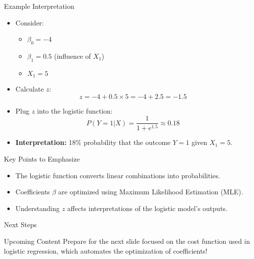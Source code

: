 \documentclass[aspectratio=169]{beamer}
\begin{document}
\begin{frame}[fragile]{Example Interpretation}
    \begin{itemize}
        \item Consider:
            \begin{itemize}
                \item \(\beta_0 = -4\)
                \item \(\beta_1 = 0.5\) (influence of \(X_1\))
                \item \(X_1 = 5\)
            \end{itemize}
        \item Calculate \(z\):
        \begin{equation}
            z = -4 + 0.5 \times 5 = -4 + 2.5 = -1.5
        \end{equation}
        
        \item Plug \(z\) into the logistic function:
        \begin{equation}
            P(Y=1|X) = \frac{1}{1 + e^{1.5}} \approx 0.18
        \end{equation}
        
        \item \textbf{Interpretation:} 18\% probability that the outcome \(Y=1\) given \(X_1 = 5\).
    \end{itemize}
\end{frame}

\begin{frame}[fragile]{Key Points to Emphasize}
    \begin{itemize}
        \item The logistic function converts linear combinations into probabilities.
        \item Coefficients \(\beta\) are optimized using Maximum Likelihood Estimation (MLE).
        \item Understanding \(z\) affects interpretations of the logistic model's outputs.
    \end{itemize}
\end{frame}

\begin{frame}[fragile]{Next Steps}
    \begin{block}{Upcoming Content}
        Prepare for the next slide focused on the cost function used in logistic regression, which automates the optimization of coefficients!
    \end{block}
\end{frame}
\end{document}
